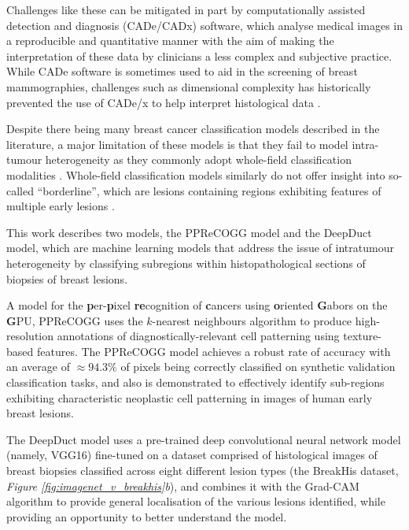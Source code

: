 Challenges like these can be mitigated in part by computationally assisted detection and diagnosis (CADe/CADx) software, which analyse medical images in a reproducible and quantitative manner with the aim of making the interpretation of these data by clinicians a less complex and subjective practice. While CADe software is sometimes used to aid in the screening of breast mammographies, challenges such as dimensional complexity has historically prevented the use of CADe/x to help interpret histological data \citep{rangayyan2007,madabhushi2009}.  \par

Despite there being many breast cancer classification models described in the literature, a major limitation of these models is that they fail to model intra-tumour heterogeneity
as they commonly adopt whole-field classification modalities \citep{pareja2017,weigelt2010}. Whole-field classification models similarly do
not offer insight into so-called ``borderline'', which are lesions containing regions exhibiting features of multiple early lesions \citep{masood2011}.\par

This work describes two models, the PPReCOGG model and the DeepDuct model, which are machine learning models that address the issue of intratumour heterogeneity by classifying subregions within histopathological sections of biopsies of breast lesions. 

A model for the \textbf{p}er-\textbf{p}ixel \textbf{re}cognition of \textbf{c}ancers using \textbf{o}riented \textbf{G}abors on the \textbf{G}PU, PPReCOGG uses the $k$-nearest neighbours algorithm to produce high-resolution annotations of diagnostically-relevant cell patterning using texture-based features. The PPReCOGG model achieves a robust rate of accuracy with an average of $\approx94.3\%$ of pixels being correctly classified on synthetic validation classification tasks, and also is demonstrated to effectively identify sub-regions exhibiting characteristic neoplastic cell patterning in images of human early breast lesions.

The DeepDuct model uses a pre-trained deep convolutional neural network model (namely, VGG16) fine-tuned on a dataset comprised of histological images of breast biopsies classified across eight different lesion types (the BreakHis dataset,  \textit{Figure \ref{fig:imagenet_v_breakhis}b}), and combines it with the Grad-CAM algorithm to provide general localisation of the various lesions identified, while providing an opportunity to better understand the model.